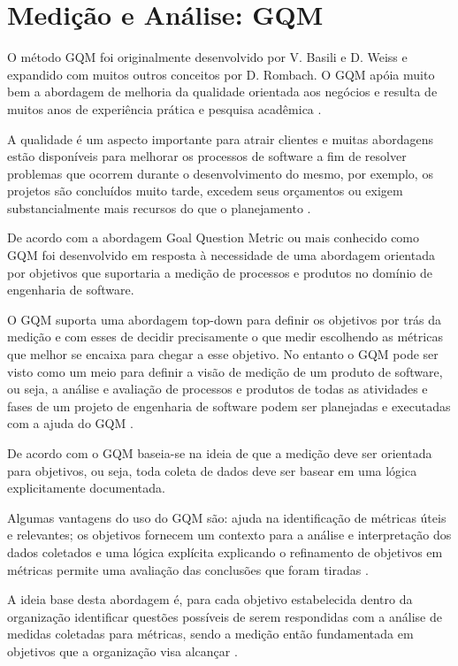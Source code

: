 \section{Medição e Análise: GQM}

O método GQM foi originalmente desenvolvido por V. Basili e D. Weiss e expandido com muitos outros conceitos por D.  Rombach. O GQM apóia muito bem a abordagem de melhoria da qualidade orientada aos negócios e resulta de muitos anos de experiência prática e pesquisa acadêmica \cite{solingen}.

A qualidade é um aspecto importante para atrair clientes e muitas abordagens estão disponíveis para melhorar os processos de software a fim de resolver problemas que ocorrem durante o desenvolvimento do mesmo, por exemplo, os projetos são concluídos muito tarde, excedem seus orçamentos ou exigem substancialmente mais recursos do que o planejamento \cite{solingen}.

De acordo com \cite{differding} a abordagem Goal Question Metric ou mais conhecido como GQM foi desenvolvido em resposta à necessidade de uma abordagem orientada por objetivos que suportaria a medição de processos e produtos no domínio de engenharia de software.

O GQM suporta uma abordagem top-down para definir os objetivos por trás da medição e com esses de decidir precisamente o que medir escolhendo as métricas que melhor se encaixa para chegar a esse objetivo. No entanto o GQM pode ser visto como um meio para definir a visão de medição de um produto de software, ou seja, a análise e avaliação de processos e produtos de todas as atividades e fases de um projeto de engenharia de software podem ser planejadas e executadas com a ajuda do GQM \cite{differding}.

De acordo com \cite{differding} o GQM baseia-se na ideia de que a medição deve ser orientada para objetivos, ou seja, toda coleta de dados deve ser basear em uma lógica explicitamente documentada.

Algumas vantagens do uso do GQM são: ajuda na identificação de métricas úteis e relevantes; os objetivos fornecem um
contexto para a análise e interpretação dos dados coletados e uma lógica explícita explicando o refinamento de objetivos
em métricas permite uma avaliação das conclusões que foram tiradas \cite{differding}.

A ideia base desta abordagem é, para cada objetivo estabelecida dentro da organização identificar questões possíveis de
serem respondidas com a análise de medidas coletadas para métricas, sendo a medição então fundamentada em objetivos que
a organização visa alcançar \cite{junior}.

